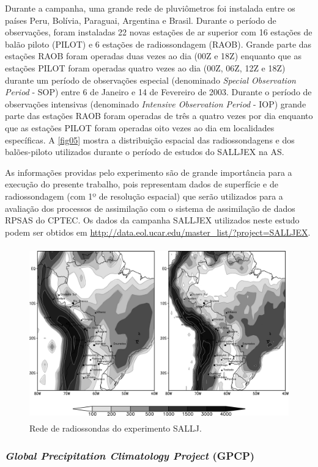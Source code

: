 Durante a campanha, uma grande rede de pluviômetros foi instalada entre os países Peru, Bolívia, Paraguai, Argentina e Brasil. Durante o período de observações, foram instaladas 22 novas estações de ar superior com 16 estações de balão piloto (PILOT) e 6 estações de radiossondagem (RAOB). Grande parte das estações RAOB foram operadas duas vezes ao dia (00Z e 18Z) enquanto que as estações PILOT foram operadas quatro vezes ao dia (00Z, 06Z, 12Z e 18Z) durante um período de observações especial (denominado \textit{Special Observation Period} - SOP) entre 6 de Janeiro e 14 de Fevereiro de 2003. Durante o período de observações intensivas (denominado \textit{Intensive Observation Period} - IOP) grande parte das estações RAOB foram operadas de três a quatro vezes por dia enquanto que as estações PILOT foram operadas oito vezes ao dia em localidades específicas. A \autoref{fig05} mostra a distribuição espacial das radiossondagens e dos balões-piloto utilizados durante o período de estudos do SALLJEX na AS. 

As informações providas pelo experimento são de grande importância para a execução do presente trabalho, pois representam dados de superfície e de radiossondagem (com 1º de resolução espacial) que serão utilizados para a avaliação dos processos de assimilação com o sistema de assimilação de dados RPSAS do CPTEC. Os dados da campanha SALLJEX utilizados neste estudo podem ser obtidos em \url{http://data.eol.ucar.edu/master_list/?project=SALLJEX}.

\begin{figure}[!hpb]
\centering
\includegraphics[height=7.5cm]{./figs/rede-salljex.png}
\caption{Rede de radiossondas do experimento SALLJ.}
\label{fig05}
\end{figure}

\subsubsection{\textit{Global Precipitation Climatology Project} (GPCP)}

